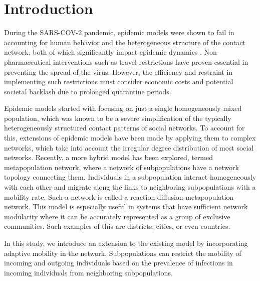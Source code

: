 \section{Introduction}

During the SARS-COV-2 pandemic, epidemic models were shown to fail in accounting for human behavior and the heterogeneous structure of the contact network, both of which significantly impact epidemic dynamics \cite{Lewis2021wrong}. Non-pharmaceutical interventions such as travel restrictions have proven essential in preventing the spread of the virus. However, the efficiency and restraint in implementing such restrictions must consider economic costs and potential societal backlash due to prolonged quarantine periods.

Epidemic models started with focusing on just a single homogeneously mixed population, which was known to be a severe simplification of the typically heterogeneously structured contact patterns of social networks. To account for this, extensions of epidemic models have been made by applying them to complex networks, which take into account the irregular degree distribution of most social networks. Recently, a more hybrid model has been explored, termed metapopulation network, where a network of subpopulations have a network topology connecting them. Individuals in a subpopulation interact homogeneously with each other and migrate along the links to neighboring subpopulations with a mobility rate. Such a network is called a reaction-diffusion metapopulation network. This model is especially useful in systems that have sufficient network modularity where it can be accurately represented as a group of exclusive communities. Such examples of this are districts, cities, or even countries. 

In this study, we introduce an extension to the existing model by incorporating adaptive mobility in the network. Subpopulations can restrict the mobility of incoming and outgoing individuals based on the prevalence of infections in incoming individuals from neighboring subpopulations.